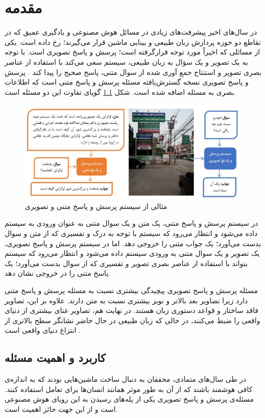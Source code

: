 \chapter{مقدمه}
\thispagestyle{empty}
	در سال‌های اخیر پیشرفت‌های زیادی در مسائل هوش مصنوعی و یادگیری عمیق که در تقاطع دو حوزه پردازش زبان طبیعی  و بینایی ماشین  قرار می‌گیرند؛ رخ داده است. یکی از مسائلی که اخیراً مورد توجه قرارگرفته است؛ پرسش و پاسخ تصویری  است. با توجه به یک تصویر و یک سؤال به زبان طبیعی، سیستم سعی می‌کند با استفاده از عناصر بصری تصویر و استنتاج جمع آوری شده از سوال متنی، پاسخ صحیح را پیدا کند 
	\cite{manmadhan2020visual}.
	پرسش و پاسخ تصویری نسخه گسترش‌یافته مسئله پرسش و پاسخ متنی است که اطلاعات بصری به مسئله اضافه شده است. شکل \ref{fig:VQAExample}  گویای تفاوت این دو مسئله است.
	\begin{figure}
		\centerline{\includegraphics[scale=0.7]{images/1.JPG}}
		\caption{مثالی از سیستم پرسش و پاسخ متنی و تصویری}
		\label{fig:VQAExample}
	\end{figure}
	
	در سیستم پرسش و پاسخ متنی، یک متن و یک سوال متنی به عنوان ورودی به سیستم داده می‌شود و انتظار می‌رود که سیستم با توجه به درک و تفسیری که از متن و سوال بدست می‌آورد؛ یک جواب متنی را خروجی دهد. اما در سیستم پرسش و پاسخ تصویری، یک تصویر و یک سوال متنی به ورودی سیستم داده می‌شود و انتظار می‌رود که سیستم بتواند با استفاده از عناصر بصری تصویر و تفسیری که از سوال بدست می‌آورد؛ یک پاسخ متنی را در خروجی نشان دهد.
	
	مسئله پرسش و پاسخ تصویری پیچیدگی بیشتری نسبت به مسئله پرسش و پاسخ متنی دارد زیرا تصاویر بعد بالاتر و نویز بیشتری نسبت به متن دارند. علاوه بر این، تصاویر فاقد ساختار و قواعد دستوری زبان هستند. در نهایت هم، تصاویر غنای بیشتری از دنیای واقعی را ضبط می‌کنند، در حالی که زبان طبیعی در حال حاضر نشانگر سطح بالاتری از انتزاع دنیای واقعی است
	\cite{wu2017visual}.
	

\section{کاربرد و اهمیت مسئله}
	در طی سال‌های متمادی، محققان به دنبال ساخت ماشین‌هایی بودند که به اندازه‌ی کافی هوشمند باشند که از آن به طور موثر همانند انسان‌ها برای تعامل استفاده کنند. مسئله‌ی پرسش و پاسخ تصویری یکی از پله‌های رسیدن به این رویای هوش مصنوعی است و از این جهت حائز اهمیت است.

